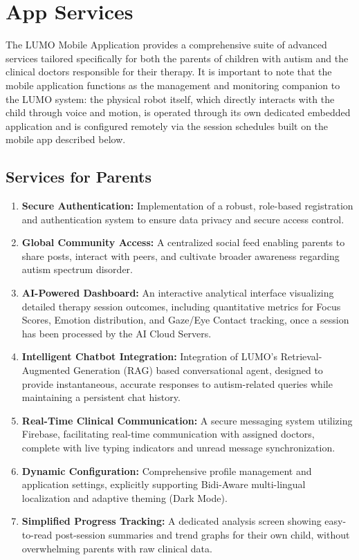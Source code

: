 \documentclass[12pt,a4paper]{report}
\begin{document}
\section{App Services}

The LUMO Mobile Application provides a comprehensive suite of advanced services tailored specifically for both the parents of children with autism and the clinical doctors responsible for their therapy. It is important to note that the mobile application functions as the management and monitoring companion to the LUMO system: the physical robot itself, which directly interacts with the child through voice and motion, is operated through its own dedicated embedded application and is configured remotely via the session schedules built on the mobile app described below.

\subsection{Services for Parents}

\begin{enumerate}
    \item \textbf{Secure Authentication:} Implementation of a robust, role-based registration and authentication system to ensure data privacy and secure access control.
    \item \textbf{Global Community Access:} A centralized social feed enabling parents to share posts, interact with peers, and cultivate broader awareness regarding autism spectrum disorder.
    \item \textbf{AI-Powered Dashboard:} An interactive analytical interface visualizing detailed therapy session outcomes, including quantitative metrics for Focus Scores, Emotion distribution, and Gaze/Eye Contact tracking, once a session has been processed by the AI Cloud Servers.
    \item \textbf{Intelligent Chatbot Integration:} Integration of LUMO's Retrieval-Augmented Generation (RAG) based conversational agent, designed to provide instantaneous, accurate responses to autism-related queries while maintaining a persistent chat history.
    \item \textbf{Real-Time Clinical Communication:} A secure messaging system utilizing Firebase, facilitating real-time communication with assigned doctors, complete with live typing indicators and unread message synchronization.
    \item \textbf{Dynamic Configuration:} Comprehensive profile management and application settings, explicitly supporting Bidi-Aware multi-lingual localization and adaptive theming (Dark Mode).
    \item \textbf{Simplified Progress Tracking:} A dedicated analysis screen showing easy-to-read post-session summaries and trend graphs for their own child, without overwhelming parents with raw clinical data.
\end{enumerate}
\end{document}
